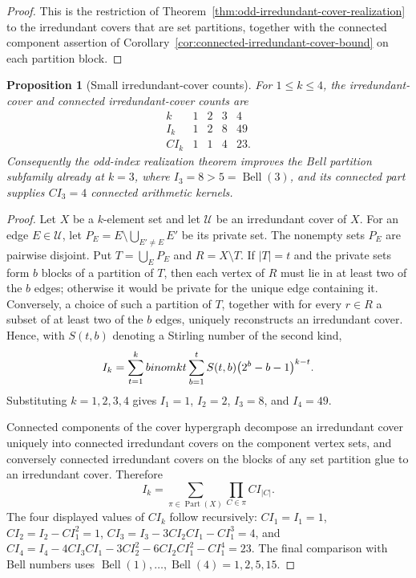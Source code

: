 \documentclass[11pt,letterpaper]{article}
\numberwithin{equation}{section}
\theoremstyle{plain}
\newtheorem{proposition}[theorem]{Proposition}
\theoremstyle{definition}
\theoremstyle{remark}
\DeclareMathOperator{\Part}{Part}
\begin{document}
\begin{proof}
This is the restriction of Theorem~\ref{thm:odd-irredundant-cover-realization}
to the irredundant covers that are set partitions, together with the connected
component assertion of Corollary~\ref{cor:connected-irredundant-cover-bound} on
each partition block.
\end{proof}

\begin{proposition}[Small irredundant-cover counts]
\label{prop:small-irredundant-cover-counts}
For \(1\le k\le4\), the irredundant-cover and connected irredundant-cover
counts are
\[
\begin{array}{c|cccc}
k&1&2&3&4\\ \hline
I_k&1&2&8&49\\
CI_k&1&1&4&23.
\end{array}
\]
Consequently the odd-index realization theorem improves the Bell partition
subfamily already at \(k=3\), where \(I_3=8>5=\operatorname{Bell}(3)\), and
its connected part supplies \(CI_3=4\) connected arithmetic kernels.
\end{proposition}

\begin{proof}
Let \(X\) be a \(k\)-element set and let \(\mathcal U\) be an irredundant
cover of \(X\). For an edge \(E\in\mathcal U\), let
\(P_E=E\setminus\bigcup_{E'\ne E}E'\) be its private set. The nonempty sets
\(P_E\) are pairwise disjoint. Put \(T=\bigcup_E P_E\) and
\(R=X\setminus T\). If \(|T|=t\) and the private sets form \(b\) blocks of a
partition of \(T\), then each vertex of \(R\) must lie in at least two of the
\(b\) edges; otherwise it would be private for the unique edge containing it.
Conversely, a choice of such a partition of \(T\), together with for every
\(r\in R\) a subset of at least two of the \(b\) edges, uniquely reconstructs
an irredundant cover. Hence, with \(S(t,b)\) denoting a Stirling number of the
second kind,
\[
I_k=\sum_{t=1}^k \\binom{k}{t}
     \sum_{b=1}^t S(t,b)\bigl(2^b-b-1\bigr)^{k-t}.
\]
Substituting \(k=1,2,3,4\) gives
\(I_1=1\), \(I_2=2\), \(I_3=8\), and \(I_4=49\).

Connected components of the cover hypergraph decompose an irredundant cover
uniquely into connected irredundant covers on the component vertex sets, and
conversely connected irredundant covers on the blocks of any set partition glue
to an irredundant cover. Therefore
\[
I_k=\sum_{\pi\in\Part(X)}\prod_{C\in\pi}CI_{|C|}.
\]
The four displayed values of \(CI_k\) follow recursively: \(CI_1=I_1=1\),
\(CI_2=I_2-CI_1^2=1\),
\(CI_3=I_3-3CI_2CI_1-CI_1^3=4\), and
\(CI_4=I_4-4CI_3CI_1-3CI_2^2-6CI_2CI_1^2-CI_1^4=23\).
The final comparison with Bell numbers uses
\(\operatorname{Bell}(1),\ldots,\operatorname{Bell}(4)=1,2,5,15\).
\end{proof}
\end{document}
